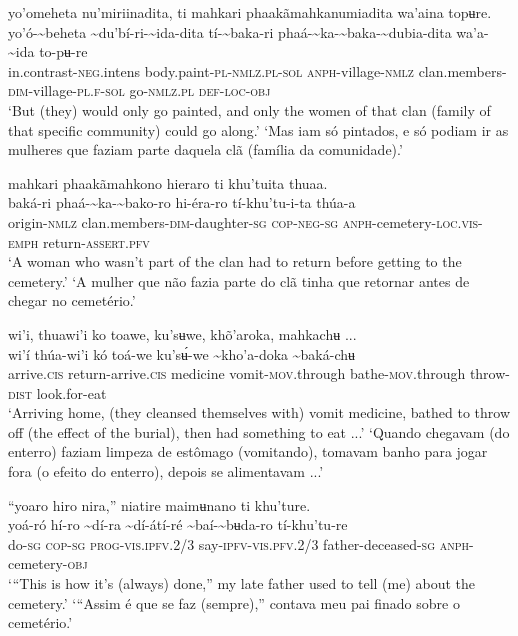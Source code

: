 \documentclass[output=paper,
modfonts,nonflat
]{langsci/langscibook}
\begin{document}
\ea yo'omeheta nu'miriinadita, ti mahkari phaakãmahkanumiadita wa'aina topʉre. \\[.3em]
\gll yo'ó-{\textasciitilde}beheta	{\textasciitilde}du'bí-ri-{\textasciitilde}ida-dita	tí-{\textasciitilde}baka-ri phaá-{\textasciitilde}ka-{\textasciitilde}baka-{\textasciitilde}dubia-dita	wa'a-{\textasciitilde}ida	to-pʉ-re\\
     in.contrast\textsc{-neg}.intens	body.paint\textsc{-pl}\textsc{-nmlz.pl-sol}	\textsc{anph}-village\textsc{-nmlz} clan.members-\textsc{dim}-village-\textsc{pl.f-sol}	go\textsc{-nmlz.pl}	\textsc{def-loc-obj}\\
\glt ‘But (they) would only go painted, and only the women of that clan (family of that specific community) could go along.’
\glt ‘Mas iam só pintados, e só podiam ir as mulheres que faziam parte daquela clã (família da comunidade).’
\z 

\largerpage
\ea mahkari phaakãmahkono hieraro ti khu'tuita thuaa. \\[.3em]
\gll {\textasciitilde}baká-ri	phaá-{\textasciitilde}ka-{\textasciitilde}bako-ro	hi-éra-ro	tí-khu'tu-i-ta	thúa-a \\
     origin\textsc{-nmlz}	clan.members-\textsc{dim}-daughter\textsc{-sg}	\textsc{cop-neg-sg}	\textsc{anph}-cemetery\textsc{-loc.vis-emph}	return-\textsc{assert.pfv}\\
\glt ‘A woman who wasn’t part of the clan had to return before getting to the cemetery.’
\newpage 
\glt ‘A mulher que não fazia parte do clã tinha que retornar antes de chegar no cemetério.’
\z

\ea wi'i, thuawi'i ko toawe, ku'sʉwe, khõ'aroka, mahkachʉ ...  \\[.3em]
\gll wi'í	thúa-wi'i	kó	toá-we	ku'sʉ́-we	{\textasciitilde}kho’a-doka	{\textasciitilde}baká-chʉ \\
     arrive\textsc{.cis}	return-arrive\textsc{.cis}	medicine	vomit-\textsc{mov.}through	bathe-\textsc{mov.}through	throw-\textsc{dist}	look.for-eat\\
\glt ‘Arriving home, (they cleansed themselves with) vomit medicine, bathed to throw off (the effect of the burial), then had something to eat ...’ 
\glt ‘Quando chegavam (do enterro) faziam limpeza de estômago (vomitando), tomavam banho para jogar fora (o efeito do enterro), depois se alimentavam ...’
\z 

\ea “yoaro hiro nira,” niatire maimʉnano ti khu'ture. \\[.3em]
\gll yoá-ró	hí-ro	{\textasciitilde}dí-ra{\footnotemark}	{\textasciitilde}dí-átí-ré	{\textasciitilde}baí-{\textasciitilde}bʉda-ro	tí-khu'tu-re \\
     do\textsc{-sg}	\textsc{cop-sg}	\textsc{prog-vis.ipfv.}2/3	say-\textsc{ipfv-vis.pfv.}2/3	father-deceased\textsc{-sg}	\textsc{anph}-cemetery\textsc{-obj}\\
\glt ‘“This is how it's (always) done,” my late father used to tell (me) about the cemetery.’
\glt ‘“Assim é que se faz (sempre),” contava meu pai finado sobre o cemetério.’
\z 
\end{document}
